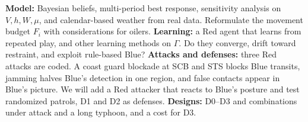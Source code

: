 \textbf{Model:} Bayesian beliefs, multi-period best response, sensitivity analysis on $V,h,W,\mu$,
and calendar-based weather from real data. Reformulate the movement budget $F_i$ with considerations for oilers. \textbf{Learning:} a Red agent that learns from repeated play, and other learning
methods on $\Gamma$. Do they converge, drift toward restraint, and exploit rule-based Blue? \textbf{Attacks and defenses:} three Red attacks are coded. A coast guard blockade at SCB and STS blocks
Blue transits, jamming halves Blue's detection in one region, and false contacts appear in Blue's
picture. We will add a Red attacker that reacts to Blue's posture and test randomized
patrols, D1 and D2 as defenses. \textbf{Designs:} D0--D3 and combinations under attack and a long typhoon, and a cost for D3.
